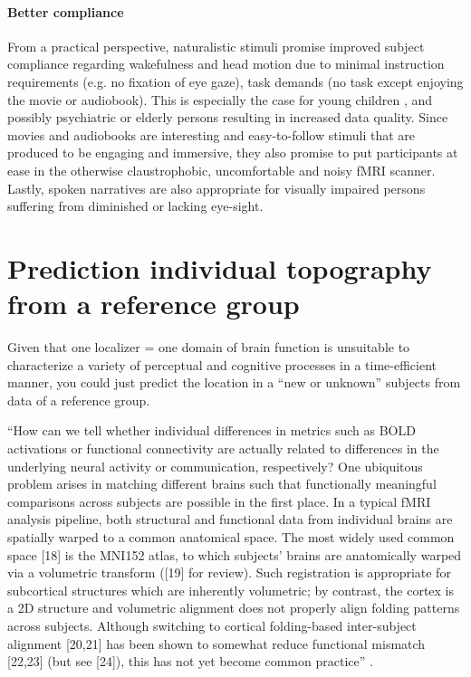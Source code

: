 \paragraph{Better compliance}

%
From a practical perspective, naturalistic stimuli promise improved subject
compliance regarding wakefulness and head motion due to minimal instruction
requirements (e.g. no fixation of eye gaze), task demands (no task except
enjoying the movie or audiobook).
%
This is especially the case for young children \citep{vanderwal2015inscapes},
and possibly psychiatric \citep{eickhoff2020towards} or elderly persons
resulting in increased data quality.
%
Since movies and audiobooks are interesting and easy-to-follow stimuli that are
produced to be engaging and immersive, they also promise to put participants at
ease in the otherwise claustrophobic, uncomfortable and noisy fMRI scanner.
%
Lastly, spoken narratives are also appropriate for visually impaired persons
suffering from diminished or lacking eye-sight.


\section{Prediction individual topography from a reference group}

Given that one localizer = one domain of brain function is unsuitable to
characterize a variety of perceptual and cognitive processes in a time-efficient
manner, you could just predict the location in a ``new or  unknown'' subjects
from data of a reference group.

``How can we tell whether individual differences in metrics such as BOLD
activations or functional connectivity are actually related to differences in
the underlying neural activity or communication, respectively? One ubiquitous
problem arises in matching different brains such that functionally meaningful
comparisons across subjects are possible in the ﬁrst place. In a typical fMRI
analysis pipeline, both structural and functional data from individual brains
are spatially warped to a common anatomical space. The most widely used common
space [18] is the MNI152 atlas, to which subjects’ brains are anatomically
warped via a volumetric transform ([19] for review). Such registration is
appropriate for subcortical structures which are inherently volumetric; by
contrast, the cortex is a 2D structure and volumetric alignment does not
properly align folding patterns across subjects. Although switching to cortical
folding-based inter-subject alignment [20,21] has been shown to somewhat reduce
functional mismatch [22,23] (but see [24]), this has not yet become common
practice'' \citep{dubois2016building}.


